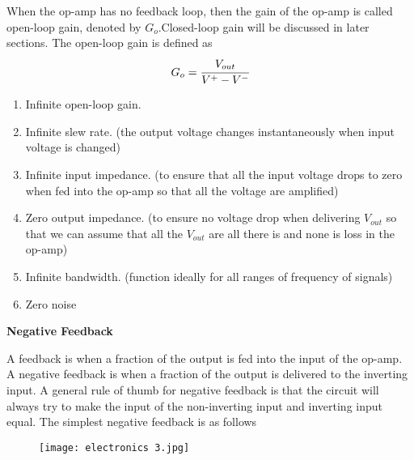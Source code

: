 \documentclass{article}
\begin{document}
 When the op-amp has no feedback loop, then the gain of the op-amp is called open-loop gain, denoted by $G_o$.Closed-loop gain will be discussed in later sections. The open-loop gain is defined as 
 $$G_o=\cfrac{V_{out}}{V^+-V^-}$$
 
 \begin{tcolorbox}[colframe=black!20!white,title=
 \color{red}{Properties of ideal op-amp}]
 \begin{enumerate}
 \color{red}
     \item Infinite open-loop gain.
     \item Infinite slew rate. (the output voltage changes instantaneously when input voltage is changed)
     \item Infinite input impedance. (to ensure that all the input voltage drops to zero when fed into the op-amp so that all the voltage are amplified)
     \item Zero output impedance. (to ensure no voltage drop when delivering $V_{out}$ so that we can assume that all the $V_{out}$ are all there is and none is loss in the op-amp)
     \item Infinite bandwidth. (function ideally for all ranges of frequency of signals)
     \item Zero noise
 \end{enumerate}
 \end{tcolorbox}
 
 \begin{flushleft}
 \textbf{Negative Feedback} 
 \end{flushleft}
 A feedback is when a fraction of the output is fed into the input of the op-amp. A negative feedback is when a fraction of the output is delivered to the inverting input. A general rule of thumb for negative feedback is that the circuit will always try to make the input of the non-inverting input and inverting input equal. The simplest negative feedback is as follows
 \begin{figure}[H]
     \centering
     \texttt{[image: electronics 3.jpg]}
 \end{figure}
 
\end{document}
